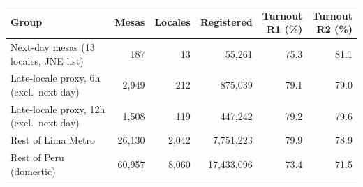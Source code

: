 \begin{tabular}{lrrrrr}
\toprule
Group & Mesas & Locales & Registered & \shortstack{Turnout\\R1 (\%)} & \shortstack{Turnout\\R2 (\%)} \\
\midrule
Next-day mesas (13 locales, JNE list) & 187 & 13 & 55,261 & 75.3 & 81.1 \\
Late-locale proxy, 6h (excl.\ next-day) & 2,949 & 212 & 875,039 & 79.1 & 79.0 \\
Late-locale proxy, 12h (excl.\ next-day) & 1,508 & 119 & 447,242 & 79.2 & 79.6 \\
Rest of Lima Metro & 26,130 & 2,042 & 7,751,223 & 79.9 & 78.9 \\
Rest of Peru (domestic) & 60,957 & 8,060 & 17,433,096 & 73.4 & 71.5 \\
\bottomrule
\end{tabular}